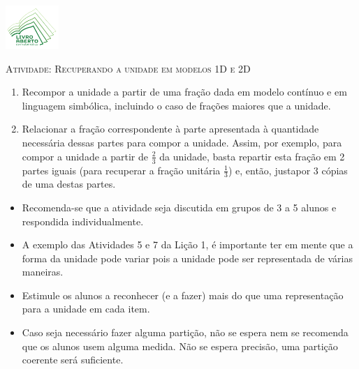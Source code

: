 \documentclass[10 pt,usenames,dvipsnames, oneside]{article}
\begin{document}
\begin{center}
  \begin{minipage}[l]{3cm}
\includegraphics[width=2cm]{logo}    
\end{minipage}\hfill
\begin{minipage}[r]{.8\textwidth}
 {\Large \scshape Atividade: Recuperando a unidade em modelos 1D e 2D}  
\end{minipage}
\end{center}
\vspace{.2cm}

\ifdefined\prof
\begin{goals}
\begin{enumerate}

    \item       Recompor a unidade a partir de uma fração dada em modelo contínuo e em linguagem simbólica, incluindo o caso de frações maiores que a unidade.
    \item       Relacionar a fração correspondente à parte apresentada à quantidade necessária dessas partes para compor a unidade. Assim, por exemplo, para compor a unidade a partir de       $\frac{2}{3}$ da unidade, basta repartir esta fração em 2 partes iguais (para recuperar a fração unitária       $\frac{1}{3}$) e, então, justapor 3 cópias de uma destas partes.


\end{enumerate}
\tcblower

  \begin{itemize} %
    \item Recomenda-se que a atividade seja discutida em grupos de 3 a 5 alunos e respondida individualmente.
 \item A exemplo das Atividades 5 e 7 da Lição 1, é importante ter em mente que a forma da unidade pode variar pois a unidade pode ser representada de várias maneiras.
    \item Estimule os alunos a reconhecer (e a fazer) mais do que uma representação para a unidade em cada item.
    \item Caso seja necessário fazer alguma partição, não se espera nem se recomenda que os alunos usem alguma medida. Não se espera precisão, uma partição coerente será suficiente. 
\end{itemize} %

\end{goals}
\end{document}
